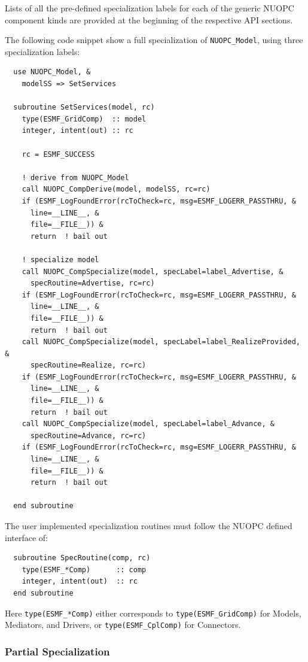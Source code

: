 Lists of all the pre-defined specialization labels for each of the generic NUOPC component kinds are provided at the beginning of the respective API sections.

The following code snippet show a full specialization of {\tt NUOPC\_Model}, using three specialization labels:

\begin{verbatim}
  use NUOPC_Model, &
    modelSS => SetServices

  subroutine SetServices(model, rc)
    type(ESMF_GridComp)  :: model
    integer, intent(out) :: rc

    rc = ESMF_SUCCESS

    ! derive from NUOPC_Model
    call NUOPC_CompDerive(model, modelSS, rc=rc)
    if (ESMF_LogFoundError(rcToCheck=rc, msg=ESMF_LOGERR_PASSTHRU, &
      line=__LINE__, &
      file=__FILE__)) &
      return  ! bail out

    ! specialize model
    call NUOPC_CompSpecialize(model, specLabel=label_Advertise, &
      specRoutine=Advertise, rc=rc)
    if (ESMF_LogFoundError(rcToCheck=rc, msg=ESMF_LOGERR_PASSTHRU, &
      line=__LINE__, &
      file=__FILE__)) &
      return  ! bail out
    call NUOPC_CompSpecialize(model, specLabel=label_RealizeProvided, &
      specRoutine=Realize, rc=rc)
    if (ESMF_LogFoundError(rcToCheck=rc, msg=ESMF_LOGERR_PASSTHRU, &
      line=__LINE__, &
      file=__FILE__)) &
      return  ! bail out
    call NUOPC_CompSpecialize(model, specLabel=label_Advance, &
      specRoutine=Advance, rc=rc)
    if (ESMF_LogFoundError(rcToCheck=rc, msg=ESMF_LOGERR_PASSTHRU, &
      line=__LINE__, &
      file=__FILE__)) &
      return  ! bail out

  end subroutine
\end{verbatim}

The user implemented specialization routines must follow the NUOPC defined interface of:

\begin{verbatim}
  subroutine SpecRoutine(comp, rc)
    type(ESMF_*Comp)      :: comp
    integer, intent(out)  :: rc
  end subroutine
\end{verbatim}

Here {\tt type(ESMF\_*Comp)} either corresponds to {\tt type(ESMF\_GridComp)} for Models, Mediators, and Drivers, or {\tt type(ESMF\_CplComp)} for Connectors.

\subsubsection{Partial Specialization}

